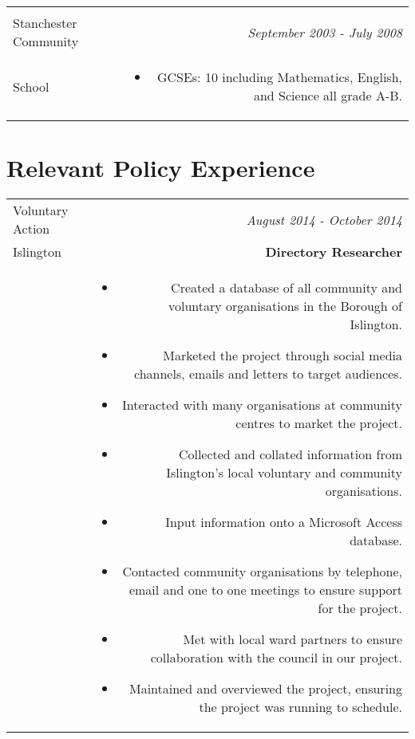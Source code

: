 \documentclass[10pt]{article}
\begin{document}
\begin{flushleft}
\begin{tabular}{L!{\VRule}R}
\begin{itemize}
\end{itemize}\\



Stanchester Community&\textsl{September 2003 - July 2008}\\
School&\vspace{-10mm} 

\begin{itemize} \itemsep1pt \parskip0pt 

\item GCSEs: 10 including Mathematics, English, and Science all grade A-B.

\end{itemize}

\end{tabular}

\section*{Relevant Policy Experience}

\begin{tabular}{L!{\VRule}R}

Voluntary Action&\textsl{August 2014 - October 2014}\\
Islington&\textbf{Directory Researcher}\\

&\vspace{-2mm}

\begin{itemize} \itemsep1pt \parskip0pt 

\item Created a database of all community and voluntary organisations in the Borough of Islington. 
\item Marketed the project through social media channels, emails and letters to target audiences.
\item Interacted with many organisations at community centres to market the project.
\item Collected and collated information from Islington’s local voluntary and community organisations.
\item Input information onto a Microsoft Access database. 
\item Contacted community organisations by telephone, email and one to one meetings to ensure support for the project. 
\item Met with local ward partners to ensure collaboration with the council in our project.
\item Maintained and overviewed the project, ensuring the project was running to schedule.


\end{itemize}
\end{tabular}
\end{flushleft}
\end{document}
